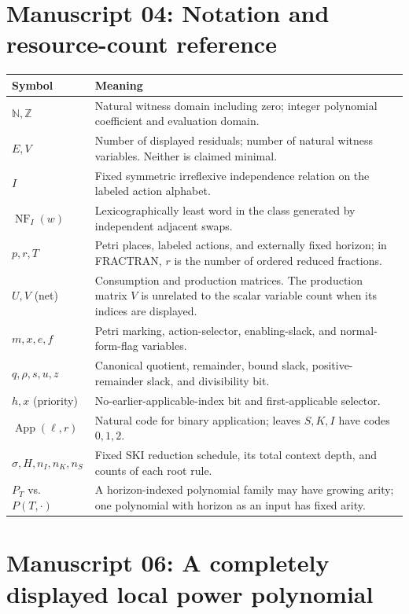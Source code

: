 \documentclass[11pt,a4paper]{article}
\theoremstyle{definition}
\theoremstyle{remark}
\newcommand{\N}{\mathbb N}
\newcommand{\Z}{\mathbb Z}
\newcommand{\NF}{\operatorname{NF}}
\newcommand{\App}{\operatorname{App}}
\begin{document}
\section{Manuscript 04: Notation and resource-count reference}
\begin{longtable}{p{.19\linewidth}p{.73\linewidth}}
\toprule
Symbol & Meaning \\
\midrule
\endhead
$\N,\Z$ & Natural witness domain including zero; integer polynomial coefficient and evaluation domain.\\
$E,V$ & Number of displayed residuals; number of natural witness variables. Neither is claimed minimal.\\
$I$ & Fixed symmetric irreflexive independence relation on the labeled action alphabet.\\
$\NF_I(w)$ & Lexicographically least word in the class generated by independent adjacent swaps.\\
$p,r,T$ & Petri places, labeled actions, and externally fixed horizon; in FRACTRAN, $r$ is the number of ordered reduced fractions.\\
$U,V$ (net) & Consumption and production matrices. The production matrix $V$ is unrelated to the scalar variable count when its indices are displayed.\\
$m,x,e,f$ & Petri marking, action-selector, enabling-slack, and normal-form-flag variables.\\
$q,\rho,s,u,z$ & Canonical quotient, remainder, bound slack, positive-remainder slack, and divisibility bit.\\
$h,x$ (priority) & No-earlier-applicable-index bit and first-applicable selector.\\
$\App(\ell,r)$ & Natural code for binary application; leaves $S,K,I$ have codes $0,1,2$.\\
$\sigma,H,n_I,n_K,n_S$ & Fixed SKI reduction schedule, its total context depth, and counts of each root rule.\\
$P_T$ vs. $P(T,\cdot)$ & A horizon-indexed polynomial family may have growing arity; one polynomial with horizon as an input has fixed arity.\\
\bottomrule
\end{longtable}


\section{Manuscript 06: A completely displayed local power polynomial}
\label{cdc:cs:app:local}
\end{document}
